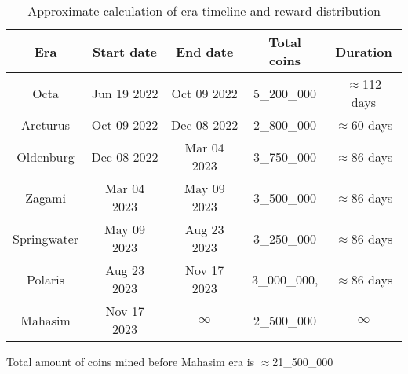 \begin{table}[h!]
\centering
\begin{tabular}{||c c c c c||}
    \hline
        Era & Start date & End date & Total coins & Duration \\ [0.5ex]

        \hline\hline
        Octa & Jun 19 2022 & Oct 09 2022 & 5\_200\_000 & $\approx$112 days \\
        Arcturus & Oct 09 2022 & Dec 08 2022 & 2\_800\_000 & $\approx$60 days \\
        Oldenburg & Dec 08 2022 & Mar 04 2023 & 3\_750\_000 & $\approx$86 days \\
        Zagami & Mar 04 2023 & May 09 2023 &  3\_500\_000 & $\approx$86 days \\
        Springwater & May 09 2023 & Aug 23 2023 & 3\_250\_000 & $\approx$86 days \\
        Polaris & Aug 23 2023& Nov 17 2023 & 3\_000\_000, & $\approx$86 days \\
        Mahasim & Nov 17 2023 & $\infty$ & 2\_500\_000 & $\infty$ \\ [1ex]
    \hline

\end{tabular}
\caption{Approximate calculation of era timeline and reward distribution}
\label{table:1}
\end{table}

Total amount of coins mined before Mahasim era is $\approx$21\_500\_000
